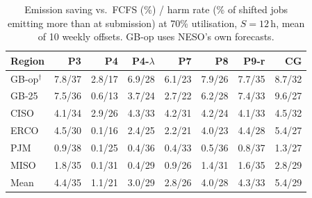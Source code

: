 \begin{table}[t]
\caption{Emission saving vs.\ FCFS (\%) / harm rate (\% of shifted jobs emitting more than at submission) at 70\% utilisation, $S{=}12$\,h, mean of 10 weekly offsets. GB-op uses NESO's own forecasts.}
\label{tab:main}
\centering\scriptsize\setlength{\tabcolsep}{2.2pt}
\begin{tabular}{lrrrrrrr}
\toprule
Region & P3 & P4 & P4-$\lambda$ & P7 & P8 & P9-r & CG \\
\midrule
GB-op$^\dagger$ & 7.8/37 & 2.8/17 & 6.9/28 & 6.1/23 & 7.9/26 & 7.7/35 & 8.7/32 \\
GB-25 & 7.5/36 & 0.6/13 & 3.7/24 & 2.7/22 & 6.2/28 & 7.4/33 & 9.6/27 \\
CISO & 4.1/34 & 2.9/26 & 4.3/33 & 4.2/31 & 4.2/24 & 4.1/33 & 4.5/32 \\
ERCO & 4.5/30 & 0.1/16 & 2.4/25 & 2.2/21 & 4.0/23 & 4.4/28 & 5.4/27 \\
PJM & 0.9/38 & 0.1/25 & 0.4/36 & 0.4/33 & 0.5/36 & 0.8/37 & 1.3/27 \\
MISO & 1.8/35 & 0.1/31 & 0.4/29 & 0.9/26 & 1.4/31 & 1.6/35 & 2.8/29 \\
\midrule
Mean & 4.4/35 & 1.1/21 & 3.0/29 & 2.8/26 & 4.0/28 & 4.3/33 & 5.4/29 \\
\bottomrule
\end{tabular}
\end{table}
